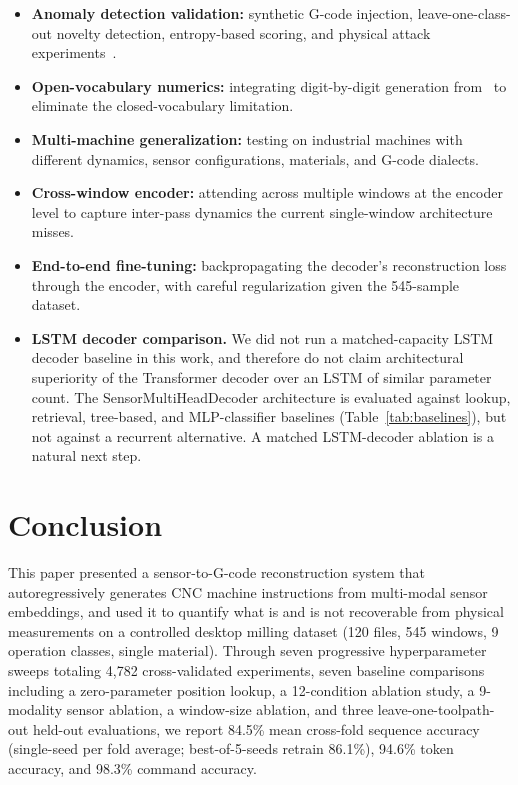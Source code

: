 \documentclass[sensors,article,submit,moreauthors,pdftex]{Definitions/mdpi}
\newcommand{\decodername}{SensorMultiHeadDecoder}
\begin{document}
\begin{itemize}[leftmargin=*]
    \item \textbf{Anomaly detection validation:} synthetic G-code injection, leave-one-class-out novelty detection, entropy-based scoring, and physical attack experiments~\cite{anomaly_paper}.
    \item \textbf{Open-vocabulary numerics:} integrating digit-by-digit generation from~\cite{grammar_paper} to eliminate the closed-vocabulary limitation.
    \item \textbf{Multi-machine generalization:} testing on industrial machines with different dynamics, sensor configurations, materials, and G-code dialects.
    \item \textbf{Cross-window encoder:} attending across multiple windows at the encoder level to capture inter-pass dynamics the current single-window architecture misses.
    \item \textbf{End-to-end fine-tuning:} backpropagating the decoder's reconstruction loss through the encoder, with careful regularization given the 545-sample dataset.
    \item \textbf{LSTM decoder comparison.} We did not run a matched-capacity LSTM decoder baseline in this work, and therefore do not claim architectural superiority of the Transformer decoder over an LSTM of similar parameter count. The \decodername{} architecture is evaluated against lookup, retrieval, tree-based, and MLP-classifier baselines (Table~\ref{tab:baselines}), but not against a recurrent alternative. A matched LSTM-decoder ablation is a natural next step.
\end{itemize}

\section{Conclusion}
\label{sec:conclusion}

This paper presented a sensor-to-G-code reconstruction system that autoregressively generates CNC machine instructions from multi-modal sensor embeddings, and used it to quantify what is and is not recoverable from physical measurements on a controlled desktop milling dataset (120 files, 545 windows, 9 operation classes, single material). Through seven progressive hyperparameter sweeps totaling 4{,}782 cross-validated experiments, seven baseline comparisons including a zero-parameter position lookup, a 12-condition ablation study, a 9-modality sensor ablation, a window-size ablation, and three leave-one-toolpath-out held-out evaluations, we report 84.5\% mean cross-fold sequence accuracy (single-seed per fold average; best-of-5-seeds retrain 86.1\%), 94.6\% token accuracy, and 98.3\% command accuracy.
\end{document}
